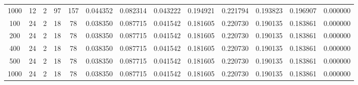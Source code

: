\begin{table}[h]
\begin{tabular}{ccccccccccccc}
1000 & 12 & 2 & 97 & 157 & 0.044352 & 0.082314 & 0.043222 & 0.194921 & 0.221794 & 0.193823 & 0.196907 & 0.000000 \\
100 & 24 & 2 & 18 & 78 & 0.038350 & 0.087715 & 0.041542 & 0.181605 & 0.220730 & 0.190135 & 0.183861 & 0.000000 \\
200 & 24 & 2 & 18 & 78 & 0.038350 & 0.087715 & 0.041542 & 0.181605 & 0.220730 & 0.190135 & 0.183861 & 0.000000 \\
400 & 24 & 2 & 18 & 78 & 0.038350 & 0.087715 & 0.041542 & 0.181605 & 0.220730 & 0.190135 & 0.183861 & 0.000000 \\
500 & 24 & 2 & 18 & 78 & 0.038350 & 0.087715 & 0.041542 & 0.181605 & 0.220730 & 0.190135 & 0.183861 & 0.000000 \\
1000 & 24 & 2 & 18 & 78 & 0.038350 & 0.087715 & 0.041542 & 0.181605 & 0.220730 & 0.190135 & 0.183861 & 0.000000 \\
\bottomrule
\end{tabular}
\end{table}
